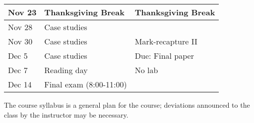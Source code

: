 \documentclass[12pt]{article}
\begin{document}
\begin{center}
\begin{tabular}[c]{lll}
Nov 23     & Thanksgiving Break                 & Thanksgiving Break                   \\
\hline
Nov 28     & Case studies                       &                                      \\
Nov 30     & Case studies                       & Mark-recapture II                    \\
\hline
Dec 5      & Case studies                       & Due: Final paper                     \\
Dec 7      & Reading day                        & No lab                               \\
\hline
Dec 14     & Final exam (8:00-11:00)            &                                      \\
\hline \hline
\end{tabular}
\end{center}

The course syllabus is a general plan for the course; deviations announced to the class by the instructor may be necessary.
\end{document}

